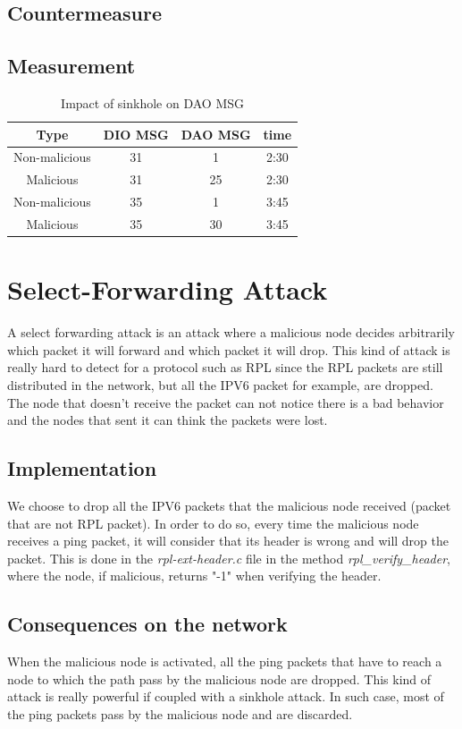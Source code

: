 \documentclass{report}
\begin{document}
\subsection*{Countermeasure}

\subsection*{Measurement}
\begin{table}[h!]
	\centering
	\caption{Impact of  sinkhole on DAO MSG}
	\begin{tabular}{cccc}
		\toprule
		Type&DIO MSG & DAO MSG&time\\
		\midrule
		Non-malicious&31&1&2:30\\
		Malicious&31&25&2:30\\
		Non-malicious&35&1&3:45\\%
		Malicious&35&30&3:45\\
		\bottomrule
	\end{tabular}
\end{table}

\section{Select-Forwarding Attack}
A select forwarding attack is an attack where a malicious node decides arbitrarily which packet it will forward and which packet it will drop. This kind of attack is really hard to detect for a protocol such as RPL since the RPL packets are still distributed in the network, but all the IPV6 packet for example, are dropped. The node that doesn't receive the packet can not notice there is a bad behavior and the nodes that sent it can think the packets were lost. 
\subsection*{Implementation}
We choose to drop all the IPV6 packets that the malicious node received (packet that are not RPL packet). In order to do so, every time the malicious node receives a ping packet, it will consider that its header is wrong and will drop the packet. This is done in the \textit{rpl-ext-header.c} file in the method \textit{rpl\_verify\_header}, where the node, if malicious, returns "-1" when verifying the header.  
\subsection*{Consequences on the network}
When the malicious node is activated, all the ping packets that have to reach a node to which the path pass by the malicious node are dropped. This kind of attack is really powerful if coupled with a sinkhole attack. In such case, most of the ping packets pass by the malicious node and are discarded. 
\end{document}
